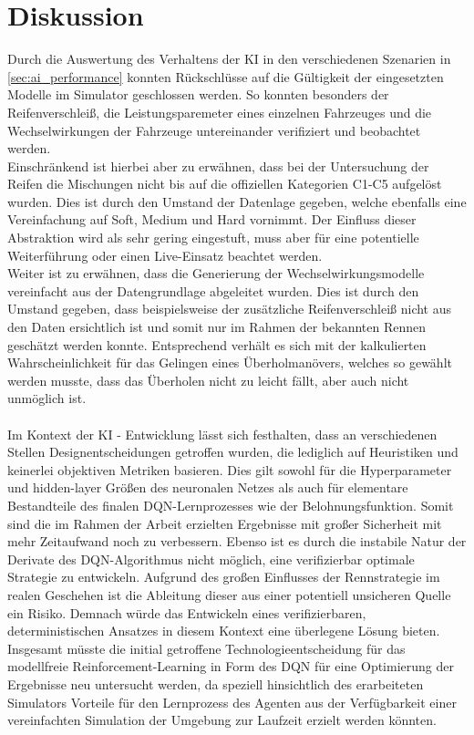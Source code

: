 \section{Diskussion}\label{sec:discussion}
Durch die Auswertung des Verhaltens der KI in den verschiedenen Szenarien in \ref{sec:ai_performance} konnten Rückschlüsse auf die Gültigkeit der eingesetzten Modelle im Simulator geschlossen werden. So konnten besonders der Reifenverschleiß, die Leistungsparemeter eines einzelnen Fahrzeuges und die Wechselwirkungen der Fahrzeuge untereinander verifiziert und beobachtet werden.\\
Einschränkend ist hierbei aber zu erwähnen, dass bei der Untersuchung der Reifen die Mischungen nicht bis auf die offiziellen Kategorien C1-C5 aufgelöst wurden. Dies ist durch den Umstand der Datenlage gegeben, welche ebenfalls eine Vereinfachung auf Soft, Medium und Hard vornimmt. Der Einfluss dieser Abstraktion wird als sehr gering eingestuft, muss aber für eine potentielle Weiterführung oder einen Live-Einsatz beachtet werden.\\
Weiter ist zu erwähnen, dass die Generierung der Wechselwirkungsmodelle vereinfacht aus der Datengrundlage abgeleitet wurden. Dies ist durch den Umstand gegeben, dass beispielsweise der zusätzliche Reifenverschleiß nicht aus den Daten ersichtlich ist und somit nur im Rahmen der bekannten Rennen geschätzt werden konnte. Entsprechend verhält es sich mit der kalkulierten Wahrscheinlichkeit für das Gelingen eines Überholmanövers, welches so gewählt werden musste, dass das Überholen nicht zu leicht fällt, aber auch nicht unmöglich ist.
\\\\
Im Kontext der KI - Entwicklung lässt sich festhalten, dass an verschiedenen Stellen Designentscheidungen getroffen wurden, die lediglich auf Heuristiken und keinerlei objektiven Metriken basieren. Dies gilt sowohl für die Hyperparameter und hidden-layer Größen des neuronalen Netzes als auch für elementare Bestandteile des finalen DQN-Lernprozesses wie der Belohnungsfunktion. Somit sind die im Rahmen der Arbeit erzielten Ergebnisse mit großer Sicherheit mit mehr Zeitaufwand noch zu verbessern. Ebenso ist es durch die instabile Natur der Derivate des DQN-Algorithmus nicht möglich, eine verifizierbar optimale Strategie zu entwickeln. Aufgrund des großen Einflusses der Rennstrategie im realen Geschehen ist die Ableitung dieser aus einer potentiell unsicheren Quelle ein Risiko. Demnach würde das Entwickeln eines verifizierbaren, deterministischen Ansatzes in diesem Kontext eine überlegene Lösung bieten. Insgesamt müsste die initial getroffene Technologieentscheidung für das modellfreie Reinforcement-Learning in Form des DQN für eine Optimierung der Ergebnisse neu untersucht werden, da speziell hinsichtlich des erarbeiteten Simulators Vorteile für den Lernprozess des Agenten aus der Verfügbarkeit einer vereinfachten Simulation der Umgebung zur Laufzeit erzielt werden könnten.
